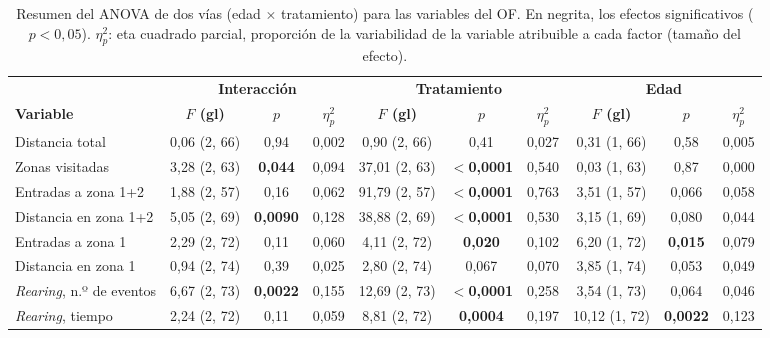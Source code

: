 \begin{table}[htbp]
\centering
\caption[Resumen del ANOVA de dos vías para las variables del OF]{Resumen del ANOVA de dos vías (edad $\times$ tratamiento) para las variables del OF. En negrita, los efectos significativos ($p < 0{,}05$). $\eta^2_p$: eta cuadrado parcial, proporción de la variabilidad de la variable atribuible a cada factor (tamaño del efecto).}
\label{tab:of-anova}
\footnotesize
\setlength{\tabcolsep}{2.5pt}
\begin{tabular*}{\linewidth}{@{\extracolsep{\fill}}l ccc ccc ccc@{}}
\toprule
& \multicolumn{3}{c}{\textbf{Interacción}} & \multicolumn{3}{c}{\textbf{Tratamiento}} & \multicolumn{3}{c}{\textbf{Edad}} \\
\cmidrule{2-4}\cmidrule{5-7}\cmidrule{8-10}
\textbf{Variable} & \textbf{$F$ (gl)} & \textbf{$p$} & \textbf{$\eta^2_p$} & \textbf{$F$ (gl)} & \textbf{$p$} & \textbf{$\eta^2_p$} & \textbf{$F$ (gl)} & \textbf{$p$} & \textbf{$\eta^2_p$} \\
\midrule
Distancia total & 0,06 (2, 66) & 0,94 & 0,002 & 0,90 (2, 66) & 0,41 & 0,027 & 0,31 (1, 66) & 0,58 & 0,005 \\
Zonas visitadas & 3,28 (2, 63) & \textbf{0,044} & 0,094 & 37,01 (2, 63) & \textbf{$<$0,0001} & 0,540 & 0,03 (1, 63) & 0,87 & 0,000 \\
Entradas a zona 1+2 & 1,88 (2, 57) & 0,16 & 0,062 & 91,79 (2, 57) & \textbf{$<$0,0001} & 0,763 & 3,51 (1, 57) & 0,066 & 0,058 \\
Distancia en zona 1+2 & 5,05 (2, 69) & \textbf{0,0090} & 0,128 & 38,88 (2, 69) & \textbf{$<$0,0001} & 0,530 & 3,15 (1, 69) & 0,080 & 0,044 \\
Entradas a zona 1 & 2,29 (2, 72) & 0,11 & 0,060 & 4,11 (2, 72) & \textbf{0,020} & 0,102 & 6,20 (1, 72) & \textbf{0,015} & 0,079 \\
Distancia en zona 1 & 0,94 (2, 74) & 0,39 & 0,025 & 2,80 (2, 74) & 0,067 & 0,070 & 3,85 (1, 74) & 0,053 & 0,049 \\
\textit{Rearing}, n.º de eventos & 6,67 (2, 73) & \textbf{0,0022} & 0,155 & 12,69 (2, 73) & \textbf{$<$0,0001} & 0,258 & 3,54 (1, 73) & 0,064 & 0,046 \\
\textit{Rearing}, tiempo & 2,24 (2, 72) & 0,11 & 0,059 & 8,81 (2, 72) & \textbf{0,0004} & 0,197 & 10,12 (1, 72) & \textbf{0,0022} & 0,123 \\
\bottomrule
\end{tabular*}
\end{table}

\FloatBarrier
